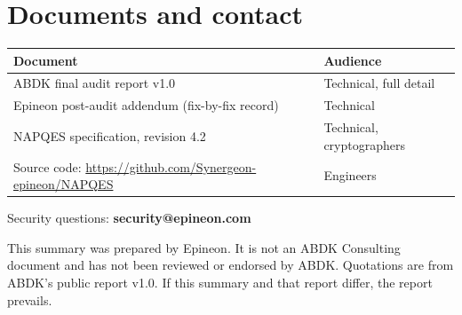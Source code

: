 ﻿\documentclass[11pt,a4paper]{article}
\begin{document}
\section{Documents and contact}
\begin{tabularx}{\linewidth}{@{}>{\raggedright\arraybackslash}X l@{}}
\toprule
\textbf{Document} & \textbf{Audience}\\
\midrule
ABDK final audit report v1.0 & Technical, full detail\\
Epineon post-audit addendum (fix-by-fix record) & Technical\\
NAPQES specification, revision 4.2 & Technical, cryptographers\\
Source code: \url{https://github.com/Synergeon-epineon/NAPQES} & Engineers\\
\bottomrule
\end{tabularx}

Security questions: \textbf{security@epineon.com}

\vfill
{\footnotesize\color{muted}This summary was prepared by Epineon. It is not an ABDK Consulting
document and has not been reviewed or endorsed by ABDK. Quotations are from ABDK's public report
v1.0. If this summary and that report differ, the report prevails.\par}
\end{document}
